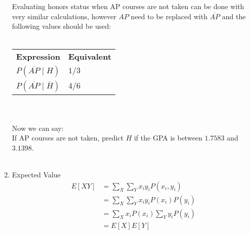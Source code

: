 \documentclass[12pt]{article}
\begin{document}
\begin{enumerate}
  		Evaluating honors status when AP courses are not taken can be done with very similar calculations, however $AP$ need to be replaced with $\overline{AP}$ and the following values should be used: \\ \\
  		\begin{tabular}{l l}
			\textbf{Expression} & \textbf{Equivalent} \\
	 		$P(\overline{AP} \mid H )$ & $1/3$ \\
	 		$P(\overline{AP} \mid \overline{H} )$ & $4/6$ \\
  		\end{tabular} \\ \\
  		Now we can say: \\
  		If AP courses are not taken, predict $H$ if the GPA is between $1.7583$ and $3.1398$. \\ \\

  		
  	\item Expected Value \\
	  	\begin{align*}
		    E[XY] &= \sum_{X}\sum_{Y}x_i y_iP(x_i,y_i) \\
		  	&= \sum_{X}\sum_{Y}x_i y_iP(x_i)P(y_i) \\
		  	&= \sum_{X}x_i P(x_i)\sum_{Y}y_i P(y_i) \\
		  	&= E[X]E[Y]
	  	\end{align*}
  	
\end{enumerate}
\end{document}
